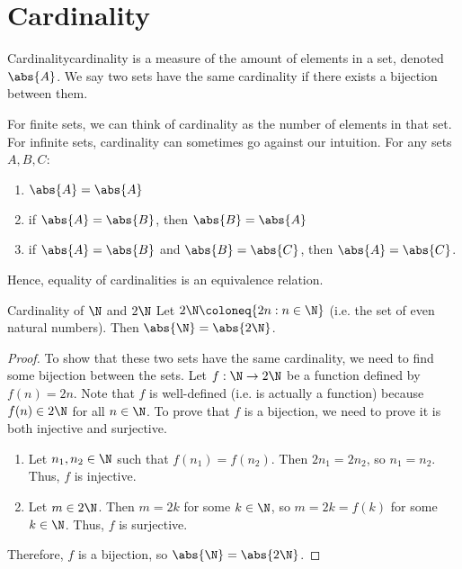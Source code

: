 \chapter{Cardinality}
\begin{dfnbox}{Cardinality}{cardinality}
     is a measure of the amount of elements in a set, denoted $\abs{A}$. We say two sets have the same cardinality if there exists a bijection between them.
\end{dfnbox}

For finite sets, we can think of cardinality as the number of elements in that set. For infinite sets, cardinality can sometimes go against our intuition. For any sets $A,B,C$:
\begin{enumerate}[noitemsep]
    \item $\abs{A} = \abs{A}$
    \item if $\abs{A} = \abs{B}$, then $\abs{B} = \abs{A}$
    \item if $\abs{A} = \abs{B}$ and $\abs{B} = \abs{C}$, then $\abs{A} = \abs{C}$.
\end{enumerate}
Hence, equality of cardinalities is an equivalence relation.

\begin{exbox}{Cardinality of $\N$ and $2\N$}{}
    Let $2\N \coloneq \{ 2n : n \in \N \}$ (i.e. the set of even natural numbers). Then $\abs{\N} = \abs{2\N}$.
    \tcblower
    \begin{proof}
        To show that these two sets have the same cardinality, we need to find some bijection between the sets. Let $f : \N \to 2\N$ be a function defined by $f(n) = 2n$. Note that $f$ is well-defined (i.e. is actually a function) because $f(n) \in 2 \N$ for all $n \in \N$. To prove that $f$ is a bijection, we need to prove it is both injective and surjective.
        \begin{enumerate}
            \item Let $n_1, n_2 \in \N$ such that $f(n_1) = f(n_2)$. Then $2n_1 = 2n_2$, so $n_1 = n_2$. Thus, $f$ is injective.
            \item Let $m \in 2\N$. Then $m = 2k$ for some $k \in \N$, so $m = 2k = f(k)$ for some $k \in \N$. Thus, $f$ is surjective.
        \end{enumerate}
        Therefore, $f$ is a bijection, so $\abs{\N} = \abs{2\N}$.
    \end{proof}
\end{exbox}

